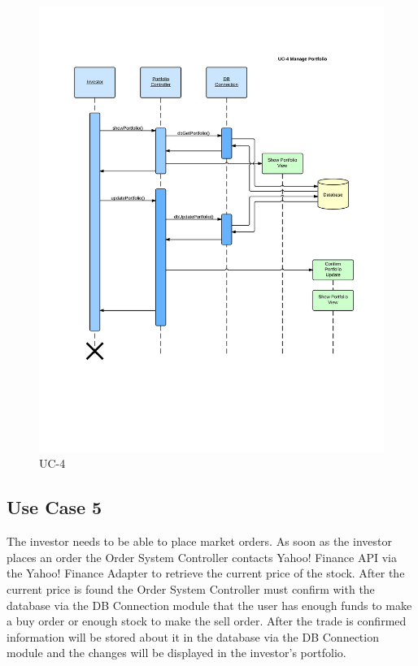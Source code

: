 \begin{figure}[H]
\centering
\includegraphics[width=5.5in]{./img/inter/uc4.jpg}
\caption{UC-4}
\end{figure}

\subsection{Use Case 5}
The investor needs to be able to place market orders. As soon as the investor
places an order the Order System Controller contacts Yahoo! Finance API via the
Yahoo! Finance Adapter to retrieve the current price of the stock. After the
current price is found the Order System Controller must confirm with the
database via the DB Connection module that the user has enough funds to make a
buy order or enough stock to make the sell order. After the trade is confirmed
information will be stored about it in the database via the DB Connection
module and the changes will be displayed in the investor’s portfolio.

